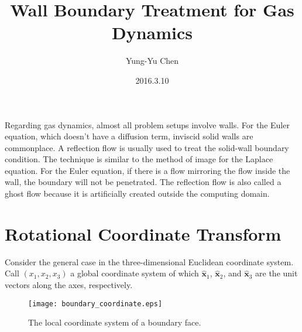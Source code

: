 \documentclass[a4paper,12pt,dvips]{article}
\begin{document}
\title{Wall Boundary Treatment for Gas Dynamics}
\author{Yung-Yu Chen}
\date{2016.3.10}

\maketitle

\tableofcontents

\hspace{.5cm}

Regarding gas dynamics, almost all problem setups involve walls.  For the Euler
equation, which doesn't have a diffusion term, inviscid solid walls are
commonplace.  A reflection flow is usually used to treat the solid-wall
boundary condition\cite{laney_computational_1998}.  The technique is similar to
the method of image for the Laplace equation.  For the Euler equation, if there
is a flow mirroring the flow inside the wall, the boundary will not be
penetrated.  The reflection flow is also called a ghost flow because it is
artificially created outside the computing domain.

\section{Rotational Coordinate Transform}

Consider the general case in the three-dimensional Euclidean coordinate system.
Call $(x_1, x_2, x_3)$ a global coordinate system of which
%
$\hat{\mathbf{x}}_1$, $\hat{\mathbf{x}}_2$, and $\hat{\mathbf{x}}_3$
%
are the unit vectors along the axes, respectively.

\begin{figure}[htbp]
\centering
\texttt{[image: boundary\_coordinate.eps]}
\caption{The local coordinate system of a boundary face.}
\label{f:boundary_coordinate}
\end{figure}
\end{document}
